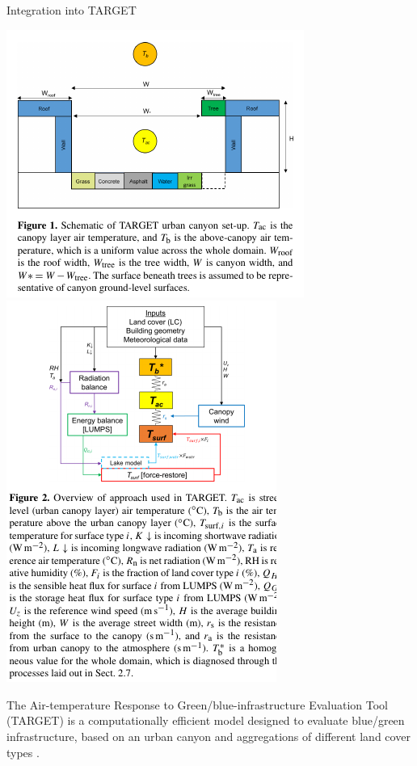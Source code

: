 \documentclass{beamer}
\begin{document}
\begin{frame}{Integration into TARGET} 

\begin{center}
\includegraphics[scale=0.60,trim={20 80 20 10},clip]{TARGET1.png}
\includegraphics[scale=0.60,trim={20 180 20 0},clip]{TARGET2.png}
\end{center}
The Air-temperature Response to Green/blue-infrastructure Evaluation Tool (TARGET) is a computationally efficient model designed to evaluate blue/green infrastructure, based on an urban canyon and aggregations of different land cover types {\footnotesize \citep{Broadbent2019}}.
\end{frame}
\end{document}
